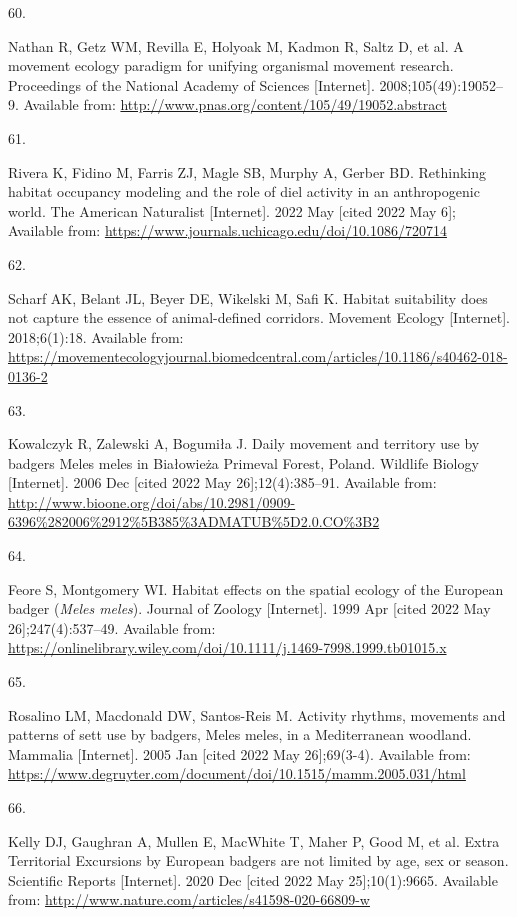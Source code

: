 \documentclass[10pt,a4paper]{article}
\newlength{\cslhangindent}
\newlength{\csllabelwidth}
\newenvironment{CSLReferences}[2] %
{\begin{list}{}{%
	\setlength{\itemindent}{0pt}
	\setlength{\leftmargin}{0pt}
	\setlength{\parsep}{0pt}
	\ifodd #1
	\setlength{\leftmargin}{\cslhangindent}
	\setlength{\itemindent}{-1\cslhangindent}
	\fi
	\setlength{\itemsep}{#2\baselineskip}}}
{\end{list}}
\newcommand{\CSLLeftMargin}[1]{\parbox[t]{\csllabelwidth}{\strut#1\strut}}
\newcommand{\CSLRightInline}[1]{\parbox[t]{\linewidth - \csllabelwidth}{\strut#1\strut}}
\begin{document}
\begin{CSLReferences}{0}{1}
\CSLLeftMargin{60. }%
\CSLRightInline{Nathan R, Getz WM, Revilla E, Holyoak M, Kadmon R, Saltz D, et al. A movement ecology paradigm for unifying organismal movement research. Proceedings of the National Academy of Sciences {[}Internet{]}. 2008;105(49):19052--9. Available from: \url{http://www.pnas.org/content/105/49/19052.abstract}}

\CSLLeftMargin{61. }%
\CSLRightInline{Rivera K, Fidino M, Farris ZJ, Magle SB, Murphy A, Gerber BD. Rethinking habitat occupancy modeling and the role of diel activity in an anthropogenic world. The American Naturalist {[}Internet{]}. 2022 May {[}cited 2022 May 6{]}; Available from: \url{https://www.journals.uchicago.edu/doi/10.1086/720714}}

\CSLLeftMargin{62. }%
\CSLRightInline{Scharf AK, Belant JL, Beyer DE, Wikelski M, Safi K. Habitat suitability does not capture the essence of animal-defined corridors. Movement Ecology {[}Internet{]}. 2018;6(1):18. Available from: \url{https://movementecologyjournal.biomedcentral.com/articles/10.1186/s40462-018-0136-2}}

\CSLLeftMargin{63. }%
\CSLRightInline{Kowalczyk R, Zalewski A, Bogumiła J. Daily movement and territory use by badgers {Meles} meles in {Białowieża} {Primeval} {Forest}, {Poland}. Wildlife Biology {[}Internet{]}. 2006 Dec {[}cited 2022 May 26{]};12(4):385--91. Available from: \url{http://www.bioone.org/doi/abs/10.2981/0909-6396\%282006\%2912\%5B385\%3ADMATUB\%5D2.0.CO\%3B2}}

\CSLLeftMargin{64. }%
\CSLRightInline{Feore S, Montgomery WI. Habitat effects on the spatial ecology of the {European} badger (\emph{{Meles} meles}). Journal of Zoology {[}Internet{]}. 1999 Apr {[}cited 2022 May 26{]};247(4):537--49. Available from: \url{https://onlinelibrary.wiley.com/doi/10.1111/j.1469-7998.1999.tb01015.x}}

\CSLLeftMargin{65. }%
\CSLRightInline{Rosalino LM, Macdonald DW, Santos-Reis M. Activity rhythms, movements and patterns of sett use by badgers, {Meles} meles, in a {Mediterranean} woodland. Mammalia {[}Internet{]}. 2005 Jan {[}cited 2022 May 26{]};69(3-4). Available from: \url{https://www.degruyter.com/document/doi/10.1515/mamm.2005.031/html}}

\CSLLeftMargin{66. }%
\CSLRightInline{Kelly DJ, Gaughran A, Mullen E, MacWhite T, Maher P, Good M, et al. Extra {Territorial} {Excursions} by {European} badgers are not limited by age, sex or season. Scientific Reports {[}Internet{]}. 2020 Dec {[}cited 2022 May 25{]};10(1):9665. Available from: \url{http://www.nature.com/articles/s41598-020-66809-w}}


\end{CSLReferences}
\end{document}
